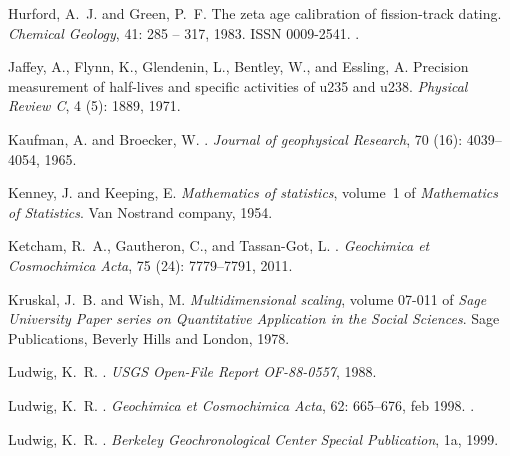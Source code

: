 \documentclass{article}
\begin{document}
\begin{thebibliography}{78}
Hurford, A.~J. and Green, P.~F.
\newblock The zeta age calibration of fission-track dating.
\newblock \emph{Chemical Geology}, 41: 285 -- 317, 1983.
\newblock ISSN 0009-2541.
\newblock {}.

Jaffey, A., Flynn, K., Glendenin, L., Bentley, W., and Essling, A.
\newblock Precision measurement of half-lives and specific activities of u235
  and u238.
\newblock \emph{Physical Review C}, 4 (5): 1889, 1971.

Kaufman, A. and Broecker, W.
.
\newblock \emph{Journal of geophysical Research}, 70 (16):
  4039--4054, 1965.

Kenney, J. and Keeping, E.
\newblock \emph{{Mathematics of statistics}}, volume~1 of \emph{Mathematics of
  Statistics}.
\newblock Van Nostrand company, 1954.

Ketcham, R.~A., Gautheron, C., and Tassan-Got, L.
.
\newblock \emph{Geochimica et Cosmochimica Acta}, 75 (24):
  7779--7791, 2011.

Kruskal, J.~B. and Wish, M.
\newblock \emph{Multidimensional scaling}, volume 07-011 of \emph{Sage
  University Paper series on Quantitative Application in the Social Sciences}.
\newblock Sage Publications, Beverly Hills and London, 1978.

Ludwig, K.~R.
.
\newblock \emph{USGS Open-File Report OF-88-0557}, 1988.

{Ludwig}, K.~R.
.
\newblock \emph{Geochimica et Cosmochimica Acta}, 62: 665--676, feb
  1998.
\newblock {}.

Ludwig, K.~R.
.
\newblock \emph{Berkeley Geochronological Center Special Publication}, 1a,
  1999.


\end{thebibliography}
\end{document}
